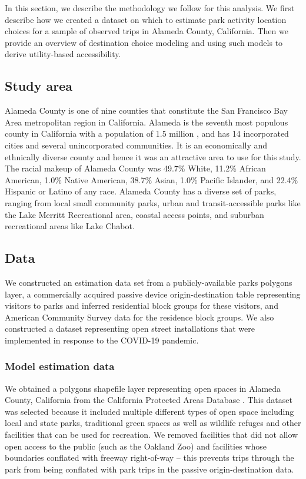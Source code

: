 \documentclass[3p, authoryear, review, doubleblind]{elsarticle} %
\begin{document}
In this section, we describe the methodology we follow for this analysis.
We first describe how we created a dataset on which to estimate park activity location
choices for a sample of observed trips in Alameda County, California. Then we
provide an overview of destination choice modeling and using such models to derive
utility-based accessibility.

\hypertarget{study-area}{%
\subsection{Study area}\label{study-area}}

Alameda County is one of nine counties that constitute the San Francisco Bay
Area metropolitan region in California. Alameda is the seventh most populous
county in California with a population of 1.5 million \citep{alamedafacts}, and has
14 incorporated cities and several unincorporated communities. It is an
economically and ethnically diverse county and hence it was an attractive area
to use for this study. The racial makeup of Alameda County was 49.7\% White,
11.2\% African American, 1.0\% Native American, 38.7\% Asian, 1.0\% Pacific
Islander, and 22.4\% Hispanic or Latino of any race. Alameda County has a
diverse set of parks, ranging from local small community parks, urban and
transit-accessible parks like the Lake Merritt Recreational area,
coastal access points, and suburban recreational areas like Lake Chabot.

\hypertarget{data}{%
\subsection{Data}\label{data}}

We constructed an estimation data set from a
publicly-available parks polygons layer, a commercially acquired passive device
origin-destination table representing visitors to parks and inferred residential
block groups for these visitors,
and American Community Survey data for the residence block groups. We also
constructed a dataset representing open street installations that were
implemented in response to the COVID-19 pandemic.

\hypertarget{model-estimation-data}{%
\subsubsection{Model estimation data}\label{model-estimation-data}}

We obtained a polygons shapefile layer representing open spaces in Alameda
County, California from the California Protected Areas Database \citep{cpad2019}.
This dataset was selected because it included multiple different types of open
space including local and state parks, traditional green spaces as well as
wildlife refuges and other facilities that can be used for recreation. We
removed facilities that did not allow open access to the public (such as the
Oakland Zoo) and facilities whose boundaries conflated with freeway right-of-way
-- this prevents trips through the park from being conflated with park trips in
the passive origin-destination data.
\end{document}
